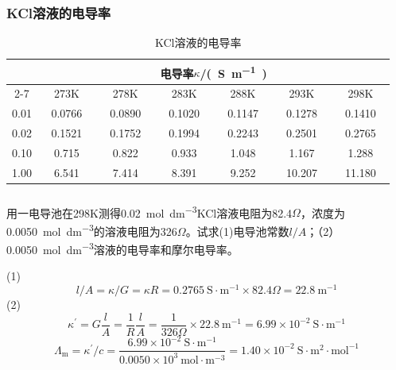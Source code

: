 \documentclass[dvipsnames, svgnames, x11names]{beamer}
\begin{document}
	
	\begin{frame}
		\frametitle{KCl溶液的电导率}
	\begin{table}[]
		\caption{KCl溶液的电导率}
		\begin{tabular}{ccccccc}
		\hline
		\rowcolor{maincolor!10} 
		\cellcolor{maincolor!10} & \multicolumn{6}{c}{\cellcolor{maincolor!10}电导率$\kappa$/\si{(S.m^{-1})}} \\ \cline{2-7} 
		\rowcolor{maincolor!10} 
		\multirow{-2}{*}{\cellcolor{maincolor!10} \si{c/(mol.dm^{-3})}} &   ~~273K~~    &   ~~278K~~    &   ~~283K~~    &    ~~288K~~   &    ~~293K~~   &    ~~298K~~  \\ \hline
			0.01    &   0.0766    &   0.0890    &   0.1020    &   0.1147    &   0.1278    &   0.1410   \\
			0.02    &   0.1521    &   0.1752    &   0.1994    &   0.2243    &   0.2501    &   0.2765   \\
			0.10    &   0.715    &   0.822    &    0.933   &    1.048   &   1.167    &   1.288   \\
			1.00    &   6.541    &   7.414    &   8.391    &   9.252    &   10.207    &   11.180   \\ \hline
		\end{tabular}
		\end{table}
	   
	\end{frame}
	
	
	\begin{frame}[t]
		\frametitle{}
	
		\begin{example}
			用一电导池在298K测得\SI{0.02}{mol.dm^{-3}}KCl溶液电阻为82.4$\Omega $，浓度为\SI{0.0050}{mol.dm^{-3}}的溶液电阻为326$\Omega $。试求(1)电导池常数$l/A$；（2）\SI{0.0050}{mol.dm^{-3}}溶液的电导率和摩尔电导率。
		\end{example}
		\pause
		(1)
		\[
		  l / A=\kappa / G=\kappa R=0.2765 \mathrm{~S} \cdot \mathrm{m}^{-1} \times 82.4 \Omega=22.8 \mathrm{~m}^{-1} 
		\]
		(2)
		\[
			\kappa^{\prime}=G \frac{l}{A}=\frac{1}{R} \frac{l}{A}=\frac{1}{326 \Omega} \times 22.8 \mathrm{~m}^{-1}=6.99 \times 10^{-2} \mathrm{~S} \cdot \mathrm{m}^{-1}
		\]
		\[
			\Lambda_{\mathrm{m}}=\kappa^{\prime} / c=\frac{6.99 \times 10^{-2} \mathrm{~S} \cdot \mathrm{m}^{-1}}{0.0050 \times 10^{3} \mathrm{~mol} \cdot \mathrm{m}^{-3}}=1.40 \times 10^{-2} \mathrm{~S} \cdot \mathrm{m}^{2} \cdot \mathrm{mol}^{-1}
		\]
	
	\end{frame}
	
\end{document}
